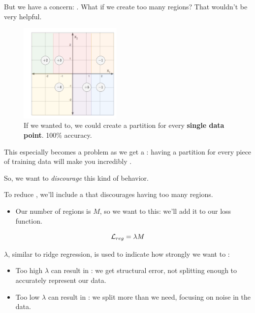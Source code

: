         But we have a concern: . What if we create too many regions? That wouldn't be very helpful.

        \begin{figure}[H]
            \centering
            \includegraphics[width=50mm,scale=0.5]{images/nonparametric_images/overfit_example.png}
            \caption*{If we wanted to, we could create a partition for every \textbf{single data point}. 100\% accuracy.}
        \end{figure}

        This especially becomes a problem as we get a : having a partition for every piece of training data will make you incredibly .

        So, we want to \textit{discourage} this kind of behavior.\\

        \begin{concept}
            To reduce , we'll include a  that discourages having too many regions.

            \begin{itemize}
                \item Our number of regions is $M$, so we want to  this: we'll add it to our loss function.
            \end{itemize}

            \begin{equation*}
                \mathcal{L}_{reg} = \lambda M
            \end{equation*}

            \subsecdiv

            $\lambda$, similar to ridge regression, is used to indicate how strongly we want to :

            \begin{itemize}
                \item Too high $\lambda$ can result in : we get structural error, not splitting enough to accurately represent our data.
                \item Too low $\lambda$ can result in : we split more than we need, focusing on noise in the data.
            \end{itemize}
        \end{concept}

